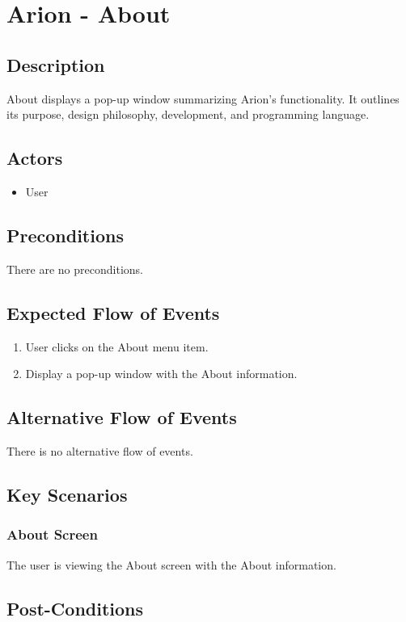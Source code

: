 \documentclass{scrreprt}
\begin{document}
\chapter{Arion - About}

\section{Description}
About displays a pop-up window summarizing Arion's functionality.
It outlines its
    purpose, 
    design philosophy,
    development,
    and programming language.

\section{Actors}
\begin{itemize}
    \item User
\end{itemize}

\section{Preconditions}
There are no preconditions.

\section{Expected Flow of Events}
\begin{enumerate}[1.]
    \item User clicks on the About menu item.
    \item Display a pop-up window with the About information.
\end{enumerate}

\section{Alternative Flow of Events}
There is no alternative flow of events.

\section{Key Scenarios}
    \subsection{About Screen}
    The user is viewing the About screen with the About information.

\section{Post-Conditions}
\end{document}
